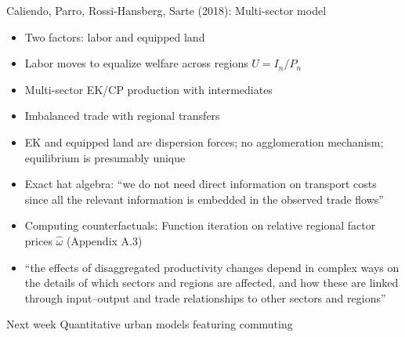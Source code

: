 \documentclass[11pt,notes=hide,aspectratio=169]{beamer}
\begin{document}
\begin{frame}{Caliendo, Parro, Rossi-Hansberg, Sarte (2018): Multi-sector model}
\begin{itemize}
\item Two factors: labor and equipped land
\item Labor moves to equalize welfare across regions $U = I_n / P_n$
\item Multi-sector EK/CP production with intermediates
\item Imbalanced trade with regional transfers
\item EK and equipped land are dispersion forces; no agglomeration mechanism; equilibrium is presumably unique
\item Exact hat algebra: ``we do not need direct information on transport costs since all the relevant information is embedded in the observed trade flows''
\item Computing counterfactuals: Function iteration on relative regional factor prices $\hat{\omega}$
(Appendix A.3)
\item {``the effects of disaggregated productivity changes depend in complex ways on the details of which sectors and regions are affected, and how these are linked through input–output and trade relationships to other sectors and regions''\par}
\end{itemize}
\end{frame}
\begin{frame}{Next week}
Quantitative urban models featuring commuting
\end{frame}
\end{document}
